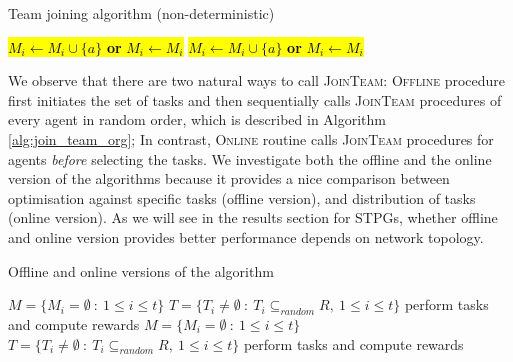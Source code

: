 \documentclass{llncs}
\begin{document}
\begin{algorithm}[H]
\caption{Team joining algorithm (non-deterministic)}
\label{alg:join_team_nondet}
\begin{scriptsize}
\begin{algorithmic}
     
       
	 
	    \State \hl{$M_i \leftarrow M_i \cup \{a\}$  \textbf{or} $M_i \leftarrow M_i$} 
	\EndIf
       
	 
	  \State \hl{$M_i \leftarrow M_i \cup \{a\}$ \textbf{or} $M_i \leftarrow M_i$} 
	\EndIf
      \EndIf
    \EndIf
  \EndFor
\EndProcedure
\end{algorithmic}
\end{scriptsize}
\end{algorithm}

We observe that there are two natural ways to call \textsc{JoinTeam}: \textsc{Offline} procedure first initiates the set of tasks and then sequentially calls \textsc{JoinTeam} procedures of every agent in random order, which is described in Algorithm \ref{alg:join_team_org}; In contrast, \textsc{Online} routine calls \textsc{JoinTeam} procedures for agents \emph{before} selecting the tasks. We investigate both the offline and the online version of the algorithms because it provides a nice comparison between optimisation against specific tasks (offline version), and distribution of tasks (online version). As we will see in the results section for STPGs, whether offline and online version provides better performance depends on network topology.


\begin{algorithm}[H]
\caption{Offline and online versions of the algorithm}
\label{alg:main_process}
\begin{scriptsize}
\begin{algorithmic}
 
  \State $M = \{M_i = \emptyset\ :\ 1\leq i \leq t\}$ 
  \State $T = \{T_i\neq \emptyset\ :\ T_i \subseteq_{random} R,\ 1\leq i \leq t\}$ 
    \State {}
  \EndFor
  \State perform tasks and compute rewards
\EndProcedure
\Statex
{} 
  \State $M = \{M_i = \emptyset\ :\ 1\leq i \leq t\}$ 
    \State {}
  \EndFor
  \State $T = \{T_i\neq \emptyset\ :\ T_i \subseteq_{random} R,\ 1\leq i \leq t\}$ 
  \State perform tasks and compute rewards
\EndProcedure
\end{algorithmic}
\end{scriptsize}
\end{algorithm}
\end{document}
